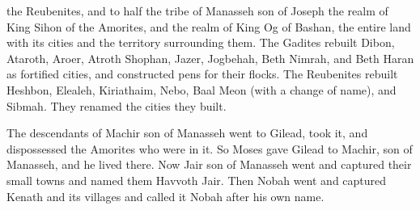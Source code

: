 {the Reubenites,
and to half
the tribe
of Manasseh
son
of Joseph
the
realm
of King
Sihon
of the Amorites,
and the realm
of King
Og
of Bashan,
the entire land
with its cities
and the territory
surrounding them.
The Gadites
rebuilt
Dibon,
Ataroth,
Aroer,
Atroth Shophan,
Jazer,
Jogbehah,
Beth Nimrah,
and Beth Haran
as fortified
cities,
and constructed pens
for their flocks.
The Reubenites
rebuilt
Heshbon,
Elealeh,
Kiriathaim,
Nebo,
Baal Meon
(with a change
of name), and Sibmah.
They renamed
the cities
they built.
\par }{\PP {}The descendants
of Machir
son
of Manasseh
went
to Gilead,
took it,
and dispossessed
the Amorites
who were in it.
So Moses
gave
Gilead
to Machir,
son
of Manasseh,
and he lived there.
Now Jair
son
of Manasseh
went
and captured
their small towns
and named
them Havvoth Jair.
Then Nobah
went
and captured
Kenath
and its
villages
and called
it Nobah
after his own name.


}
